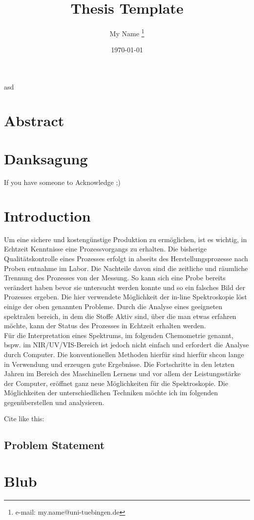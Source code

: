 \documentclass[a4paper,cleardoubleempty,BCOR1cm]{scrbook}
\title{Thesis Template}
\author{My Name \thanks{e-mail: my.name@uni-tuebingen.de}}
\date{\today}
\begin{document}

asd
\chapter*{Abstract}



\chapter*{Danksagung}
If you have someone to Acknowledge ;)

\tableofcontents


\chapter{Introduction}
Um eine sichere und kostengünstige Produktion zu ermöglichen, ist es wichtig, in Echtzeit Kenntnisse eine Prozessvorgangs zu erhalten. Die bisherige Qualitätskontrolle eines Prozesses erfolgt in abseits des Herstellungsprozesse nach Proben entnahme im Labor. Die Nachteile davon sind die zeitliche und räumliche Trennung des Prozesses von der Messung. So kann sich eine Probe bereits verändert haben bevor sie untersucht werden konnte und so ein falsches Bild der Prozesses ergeben. Die hier verwendete Möglichkeit der in-line Spektroskopie löst einige der oben genannten Probleme. Durch die Analyse eines geeigneten spektralen bereich, in dem die Stoffe Aktiv sind, über die man etwas erfahren möchte, kann der Status des Prozesses in Echtzeit erhalten werden. \\
Für die Interpretation eines Spektrums, im folgenden Chemometrie genannt, bspw. im NIR/UV/VIS-Bereich ist jedoch nicht einfach und erfordert die Analyse durch Computer. Die konventionellen Methoden hierfür%
sind hierfür shcon lange in Verwendung und erzeugen gute Ergebnisse. Die Fortschritte in den letzten Jahren im Bereich des Maschinellen Lernens und vor allem der Leistungsstärke der Computer, eröffnet ganz neue Möglichkeiten für die Spektroskopie. Die Möglichkeiten der unterschiedlichen Techniken möchte ich im folgenden gegenüberstellen und analysieren. 

Cite like this: \cite{agarwal2011}



\section{Problem Statement}



\appendix
\chapter{Blub}



\end{document}

